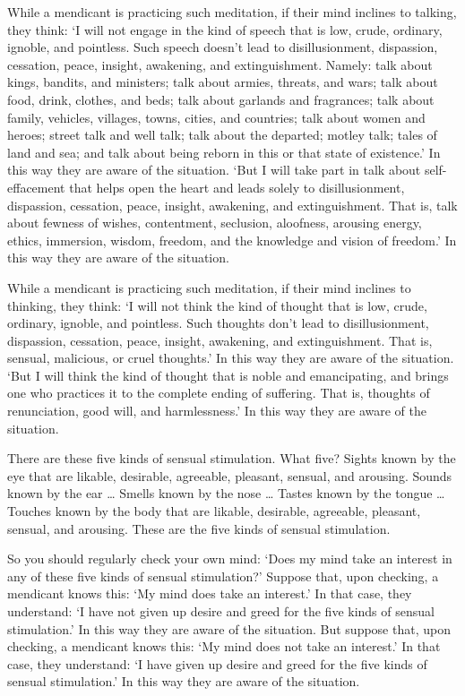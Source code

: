 \documentclass[12pt,openany]{book}%
\begin{document}
While a mendicant is practicing such meditation, if their mind inclines to talking, they think: ‘I will not engage in the kind of speech that is low, crude, ordinary, ignoble, and pointless. Such speech doesn’t lead to disillusionment, dispassion, cessation, peace, insight, awakening, and extinguishment. Namely: talk about kings, bandits, and ministers; talk about armies, threats, and wars; talk about food, drink, clothes, and beds; talk about garlands and fragrances; talk about family, vehicles, villages, towns, cities, and countries; talk about women and heroes; street talk and well talk; talk about the departed; motley talk; tales of land and sea; and talk about being reborn in this or that state of existence.’ In this way they are aware of the situation. ‘But I will take part in talk about self-effacement that helps open the heart and leads solely to disillusionment, dispassion, cessation, peace, insight, awakening, and extinguishment. That is, talk about fewness of wishes, contentment, seclusion, aloofness, arousing energy, ethics, immersion, wisdom, freedom, and the knowledge and vision of freedom.’ In this way they are aware of the situation. 

While a mendicant is practicing such meditation, if their mind inclines to thinking, they think: ‘I will not think the kind of thought that is low, crude, ordinary, ignoble, and pointless. Such thoughts don’t lead to disillusionment, dispassion, cessation, peace, insight, awakening, and extinguishment. That is, sensual, malicious, or cruel thoughts.’ In this way they are aware of the situation. ‘But I will think the kind of thought that is noble and emancipating, and brings one who practices it to the complete ending of suffering. That is, thoughts of renunciation, good will, and harmlessness.’ In this way they are aware of the situation. 

There are these five kinds of sensual stimulation. What five? Sights known by the eye that are likable, desirable, agreeable, pleasant, sensual, and arousing. Sounds known by the ear … Smells known by the nose … Tastes known by the tongue … Touches known by the body that are likable, desirable, agreeable, pleasant, sensual, and arousing. These are the five kinds of sensual stimulation. 

So you should regularly check your own mind: ‘Does my mind take an interest in any of these five kinds of sensual stimulation?’ Suppose that, upon checking, a mendicant knows this: ‘My mind does take an interest.’ In that case, they understand: ‘I have not given up desire and greed for the five kinds of sensual stimulation.’ In this way they are aware of the situation. But suppose that, upon checking, a mendicant knows this: ‘My mind does not take an interest.’ In that case, they understand: ‘I have given up desire and greed for the five kinds of sensual stimulation.’ In this way they are aware of the situation. 
\end{document}
